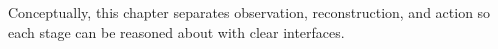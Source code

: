 Conceptually, this chapter separates observation, reconstruction, and action so each stage can be reasoned about with clear interfaces.
